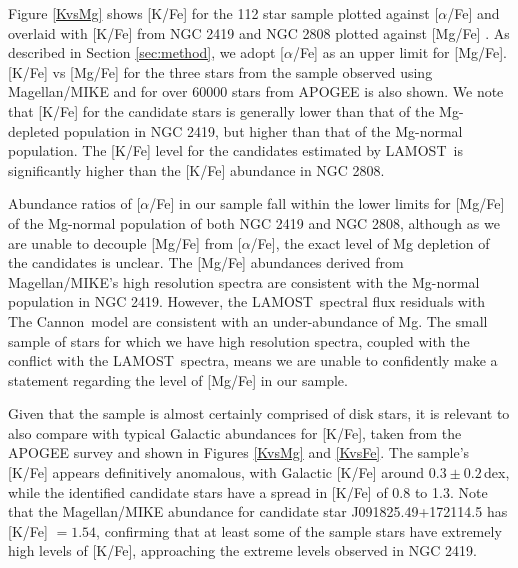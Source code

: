 \documentclass[a4paper,fleqn,usenatbib]{mnras}
\newcommand{\project}[1]{#1}
\newcommand{\lamost}{\project{LAMOST}}
\newcommand{\tc}{\project{The Cannon}}
\begin{document}
Figure \ref{KvsMg} shows [K/Fe]  for the 112 star sample plotted against $[\alpha$/Fe] and overlaid with [K/Fe] from NGC 2419 and NGC 2808 plotted against [Mg/Fe] \citep{cohenkirby2012, mucciarelli2012, mucciarelli2015}. As described in Section \ref{sec:method}, we adopt [$\alpha$/Fe] as an upper limit for [Mg/Fe]. [K/Fe] vs [Mg/Fe] for the three stars from the sample observed using Magellan/MIKE and for over 60000 stars from APOGEE \citep{alam2015} is also shown. 
We note that [K/Fe] for the candidate stars is generally lower than that of the Mg-depleted population in NGC 2419, but higher than that of the Mg-normal population. The [K/Fe] level for the candidates estimated by \lamost\ is significantly higher than the [K/Fe] abundance in NGC 2808.

Abundance ratios of [$\alpha$/Fe] in our sample fall within the lower limits for [Mg/Fe] of the Mg-normal population of both NGC 2419 and NGC 2808, although as we are unable to decouple [Mg/Fe] from $[\alpha$/Fe], the exact level of Mg depletion of the candidates is unclear. The [Mg/Fe] abundances derived from Magellan/MIKE's high resolution spectra are consistent with the Mg-normal population in NGC 2419. However, the \lamost\ spectral flux residuals with \tc\ model are consistent with an under-abundance of Mg. The small sample of stars for which we have high resolution spectra, coupled with the conflict with the \lamost\ spectra, means we are unable to confidently make a statement regarding the level of [Mg/Fe] in our sample. 

Given that the sample is almost certainly comprised of disk stars, it is relevant to also compare with typical Galactic abundances for [K/Fe], taken from the APOGEE survey \citep{alam2015} and shown in Figures \ref{KvsMg} and \ref{KvsFe}. The sample's [K/Fe] appears definitively anomalous, with Galactic [K/Fe] around $0.3 \pm 0.2$\,dex, while the identified candidate stars have a spread in [K/Fe] of 0.8 to 1.3. Note that the Magellan/MIKE abundance for candidate star J091825.49+172114.5 has [K/Fe] $=1.54$, confirming that at least some of the sample stars have extremely high levels of [K/Fe], approaching the extreme levels observed in NGC 2419.
\end{document}
